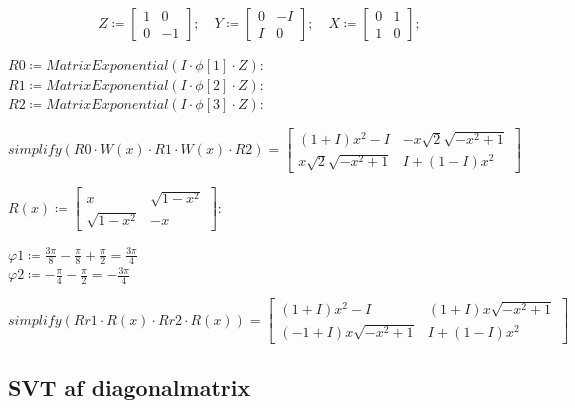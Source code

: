 \documentclass[11pt,a4paper]{article}
\begin{document}
\begin{equation}
Z \coloneqq \begin{bmatrix} 1 & 0 \\ 0 & -1 \end{bmatrix}; \quad 
Y \coloneqq \begin{bmatrix} 0 & -I \\ I & 0 \end{bmatrix}; \quad 
X \coloneqq \begin{bmatrix} 0 & 1 \\ 1 & 0 \end{bmatrix};
\end{equation}

$R0 \coloneqq MatrixExponential(I \cdot \phi[1] \cdot Z) :$ \\
$R1 \coloneqq MatrixExponential(I \cdot \phi[2] \cdot Z) :$ \\
$R2 \coloneqq MatrixExponential(I \cdot \phi[3] \cdot Z) :$

\begin{equation}
simplify(R0 \cdot W(x) \cdot R1 \cdot W(x) \cdot R2) = 
\begin{bmatrix} 
(1+I)x^2 - I & -x\sqrt{2}\sqrt{-x^2+1} \\ 
x\sqrt{2}\sqrt{-x^2+1} & I + (1-I)x^2 
\end{bmatrix}
\end{equation}

$R(x) \coloneqq \begin{bmatrix} x & \sqrt{1-x^2} \\ \sqrt{1-x^2} & -x \end{bmatrix} :$

$\varphi1 \coloneqq \frac{3\pi}{8} - \frac{\pi}{8} + \frac{\pi}{2} = \frac{3\pi}{4}$ \\
$\varphi2 \coloneqq -\frac{\pi}{4} - \frac{\pi}{2} = -\frac{3\pi}{4}$

\begin{equation}
simplify(Rr1 \cdot R(x) \cdot Rr2 \cdot R(x)) = 
\begin{bmatrix} 
(1+I)x^2 - I & (1+I)x\sqrt{-x^2+1} \\ 
(-1+I)x\sqrt{-x^2+1} & I + (1-I)x^2 
\end{bmatrix}
\end{equation}

\subsection*{SVT af diagonalmatrix}
\end{document}
